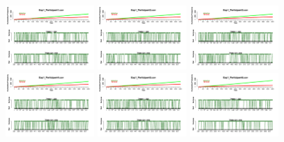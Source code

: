 \begin{figure}[th]
\centering
\includegraphics[width=0.30\textwidth]{Figures/Success_Exp1_P1} \includegraphics[width=0.30\textwidth]{Figures/Success_Exp1_P2} \includegraphics[width=0.30\textwidth]{Figures/Success_Exp1_P3}
\includegraphics[width=0.30\textwidth]{Figures/Success_Exp1_P4} \includegraphics[width=0.30\textwidth]{Figures/Success_Exp1_P5} \includegraphics[width=0.30\textwidth]{Figures/Success_Exp1_P6}

\end{figure}
